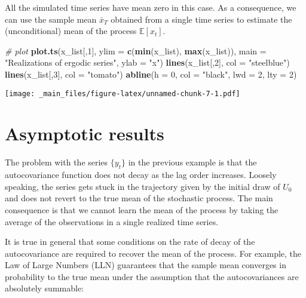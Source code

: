 \documentclass[
]{book}
\newenvironment{Shaded}{\begin{snugshade}}{\end{snugshade}}
\newcommand{\AttributeTok}[1]{\textcolor[rgb]{0.13,0.29,0.53}{#1}}
\newcommand{\CommentTok}[1]{\textcolor[rgb]{0.56,0.35,0.01}{\textit{#1}}}
\newcommand{\DecValTok}[1]{\textcolor[rgb]{0.00,0.00,0.81}{#1}}
\newcommand{\FunctionTok}[1]{\textcolor[rgb]{0.13,0.29,0.53}{\textbf{#1}}}
\newcommand{\NormalTok}[1]{#1}
\newcommand{\StringTok}[1]{\textcolor[rgb]{0.31,0.60,0.02}{#1}}
\begin{document}
All the simulated time series have mean zero in this case. As a consequence, we can use the sample mean \(\bar{x}_T\) obtained from a single time series to estimate the (unconditional) mean of the process \(\mathbb{E}[x_t]\).

\begin{Shaded}
\begin{Highlighting}[]
\CommentTok{\# plot}
\FunctionTok{plot.ts}\NormalTok{(x\_list[,}\DecValTok{1}\NormalTok{], }\AttributeTok{ylim =} \FunctionTok{c}\NormalTok{(}\FunctionTok{min}\NormalTok{(x\_list), }\FunctionTok{max}\NormalTok{(x\_list)), }
        \AttributeTok{main =} \StringTok{"Realizations of ergodic series"}\NormalTok{, }\AttributeTok{ylab =} \StringTok{"x"}\NormalTok{)}
\FunctionTok{lines}\NormalTok{(x\_list[,}\DecValTok{2}\NormalTok{], }\AttributeTok{col =} \StringTok{"steelblue"}\NormalTok{)}
\FunctionTok{lines}\NormalTok{(x\_list[,}\DecValTok{3}\NormalTok{], }\AttributeTok{col =} \StringTok{"tomato"}\NormalTok{)}
\FunctionTok{abline}\NormalTok{(}\AttributeTok{h =} \DecValTok{0}\NormalTok{, }\AttributeTok{col =} \StringTok{"black"}\NormalTok{, }\AttributeTok{lwd =} \DecValTok{2}\NormalTok{, }\AttributeTok{lty =} \DecValTok{2}\NormalTok{)}
\end{Highlighting}
\end{Shaded}

\texttt{[image: \_main\_files/figure-latex/unnamed-chunk-7-1.pdf]}

\hypertarget{asymptotic-results}{%
\section{Asymptotic results}\label{asymptotic-results}}

The problem with the series \(\{y_t\}\) in the previous example is that the autocovariance function does not decay as the lag order increases. Loosely speaking, the series gets stuck in the trajectory given by the initial draw of \(U_0\) and does not revert to the true mean of the stochastic process. The main consequence is that we cannot learn the mean of the process by taking the average of the observations in a single realized time series.

It is true in general that some conditions on the rate of decay of the autocovariance are required to recover the mean of the process. For example, the Law of Large Numbers (LLN) guarantees that the sample mean converges in probability to the true mean under the assumption that the autocovariances are absolutely summable:
\end{document}
